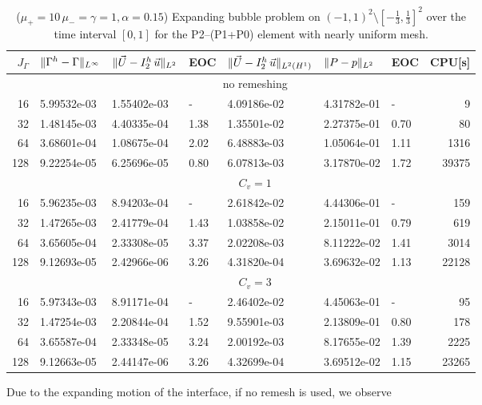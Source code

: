 \begin{table}
\center
\hspace*{-3.25cm}
\begin{tabular}{rllllllr}
\hline
$J_\Gamma$ & $\|\Gamma^h - \Gamma\|_{L^\infty}$ & $\|\vec U - I^h_{2}\,\vec u\|_{L^2}$ & EOC & $\|\vec U - I^h_{2}\,\vec u\|_{L^2(H^1)}$ & $\|P - p\|_{L^2}$ & EOC
& CPU[s] \\
\hline
& \multicolumn{7}{c}{no remeshing} \\
\hline
 16 & 5.99532e-03 & 1.55402e-03 &    - & 4.09186e-02 & 4.31782e-01 &    - &
9 \\
 32 & 1.48145e-03 & 4.40335e-04 & 1.38 & 1.35501e-02 & 2.27375e-01 & 0.70 &
80 \\
 64 & 3.68601e-04 & 1.08675e-04 & 2.02 & 6.48883e-03 & 1.05064e-01 & 1.11 &
1316 \\
128 & 9.22254e-05 & 6.25696e-05 & 0.80 & 6.07813e-03 & 3.17870e-02 & 1.72 &
39375 \\
\hline
& \multicolumn{7}{c}{$C_v=1$} \\
\hline
 16 & 5.96235e-03 & 8.94203e-04 &    - & 2.61842e-02 & 4.44306e-01 &    - &
159 \\
 32 & 1.47265e-03 & 2.41779e-04 & 1.43 & 1.03858e-02 & 2.15011e-01 & 0.79 &
619 \\
 64 & 3.65605e-04 & 2.33308e-05 & 3.37 & 2.02208e-03 & 8.11222e-02 & 1.41 &
3014 \\
128 & 9.12693e-05 & 2.42966e-06 & 3.26 & 4.31820e-04 & 3.69632e-02 & 1.13 &
22128 \\
\hline
& \multicolumn{7}{c}{$C_v=3$} \\
\hline
 16 & 5.97343e-03 & 8.91171e-04 &    - & 2.46402e-02 & 4.45063e-01 &    - &
95 \\
 32 & 1.47254e-03 & 2.20844e-04 & 1.52 & 9.55901e-03 & 2.13809e-01 & 0.80 &
178 \\
 64 & 3.65587e-04 & 2.33348e-05 & 3.24 & 2.00192e-03 & 8.17655e-02 & 1.39 &
2225 \\
128 & 9.12663e-05 & 2.44147e-06 & 3.26 & 4.32699e-04 & 3.69512e-02 & 1.15 &
23265 \\
\hline
\end{tabular}
\hspace*{-3.25cm}
\caption[Stokes expanding bubble uniform mesh errors P2--(P1+P0)]
{($\mu_+ = 10\,\mu_- = \gamma = 1,\alpha = 0.15$) Expanding bubble
problem on $(-1,1)^2\setminus[-\frac{1}{3},\frac{1}{3}]^2$ over the time
interval $[0,1]$ for the P2--(P1+P0) element with nearly uniform mesh.}
\label{tab:expandingbubble2Dp2p1p0}
\end{table}
Due to the expanding motion of the interface, if no remesh is used, we observe
